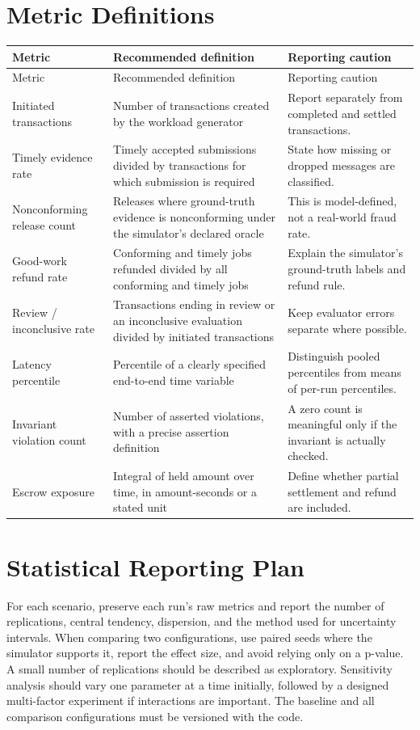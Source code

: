 \documentclass[12pt,a4paper,oneside]{report}
\begin{document}
\section{Metric Definitions}
\small
\begin{longtable}{>{\raggedright\arraybackslash}p{}>{\raggedright\arraybackslash}p{}>{\raggedright\arraybackslash}p{}}
\toprule
Metric & Recommended definition & Reporting caution \\
\midrule
\endfirsthead
\toprule Metric & Recommended definition & Reporting caution \\
\endhead
Initiated transactions & Number of transactions created by the workload generator & Report separately from completed and settled transactions. \\
Timely evidence rate & Timely accepted submissions divided by transactions for which submission is required & State how missing or dropped messages are classified. \\
Nonconforming release count & Releases where ground-truth evidence is nonconforming under the simulator's declared oracle & This is model-defined, not a real-world fraud rate. \\
Good-work refund rate & Conforming and timely jobs refunded divided by all conforming and timely jobs & Explain the simulator's ground-truth labels and refund rule. \\
Review / inconclusive rate & Transactions ending in review or an inconclusive evaluation divided by initiated transactions & Keep evaluator errors separate where possible. \\
Latency percentile & Percentile of a clearly specified end-to-end time variable & Distinguish pooled percentiles from means of per-run percentiles. \\
Invariant violation count & Number of asserted violations, with a precise assertion definition & A zero count is meaningful only if the invariant is actually checked. \\
Escrow exposure & Integral of held amount over time, in amount-seconds or a stated unit & Define whether partial settlement and refund are included. \\
\bottomrule
\end{longtable}
\normalsize

\section{Statistical Reporting Plan}
For each scenario, preserve each run's raw metrics and report the number of replications, central tendency, dispersion, and the method used for uncertainty intervals. When comparing two configurations, use paired seeds where the simulator supports it, report the effect size, and avoid relying only on a p-value. A small number of replications should be described as exploratory. Sensitivity analysis should vary one parameter at a time initially, followed by a designed multi-factor experiment if interactions are important. The baseline and all comparison configurations must be versioned with the code.
\end{document}
